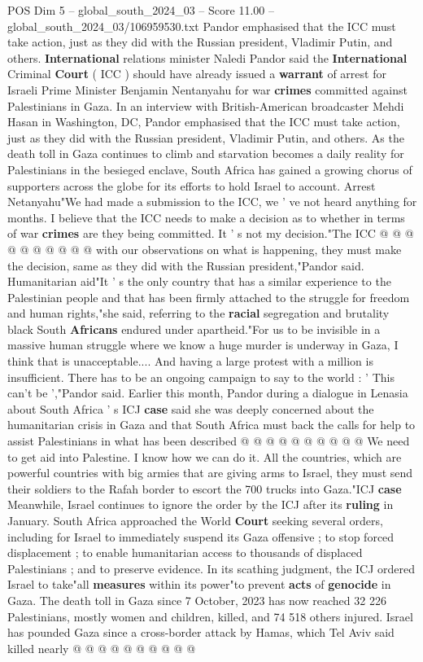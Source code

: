 \begin{textsample}{POS Dim 5 – global\_south\_2024\_03 – Score 11.00 – global\_south\_2024\_03/106959530.txt}  \label{ex:f5_pos_149}
Pandor emphasised that the ICC must take action, just as they did with the Russian president, Vladimir Putin, and others. \textbf{International} relations minister Naledi Pandor said the \textbf{International} Criminal \textbf{Court} ( ICC ) should have already issued a \textbf{warrant} of arrest for Israeli Prime Minister Benjamin Nentanyahu for war \textbf{crimes} committed against Palestinians in Gaza.
In an interview with British-American broadcaster Mehdi Hasan in Washington, DC, Pandor emphasised that the ICC must take action, just as they did with the Russian president, Vladimir Putin, and others.
As the death toll in Gaza continues to climb and starvation becomes a daily reality for Palestinians in the besieged enclave, South Africa has gained a growing chorus of supporters across the globe for its efforts to hold Israel to account.
Arrest Netanyahu"We had made a submission to the ICC, we ' ve not heard anything for months.
I believe that the ICC needs to make a decision as to whether in terms of war \textbf{crimes} are they being committed.
It ' s not my decision."The ICC @ @ @ @ @ @ @ @ @ @ with our observations on what is happening, they must make the decision, same as they did with the Russian president,"Pandor said.
Humanitarian aid"It ' s the only country that has a similar experience to the Palestinian people and that has been firmly attached to the struggle for freedom and human rights,"she said, referring to the \textbf{racial} segregation and brutality black South \textbf{Africans} endured under apartheid."For us to be invisible in a massive human struggle where we know a huge murder is underway in Gaza, I think that is unacceptable....
And having a large protest with a million is insufficient.
There has to be an ongoing campaign to say to the world : ' This can't be ',"Pandor said.
Earlier this month, Pandor during a dialogue in Lenasia about South Africa ' s ICJ \textbf{case} said she was deeply concerned about the humanitarian crisis in Gaza and that South Africa must back the calls for help to assist Palestinians in what has been described @ @ @ @ @ @ @ @ @ @ We need to get aid into Palestine.
I know how we can do it.
All the countries, which are powerful countries with big armies that are giving arms to Israel, they must send their soldiers to the Rafah border to escort the 700 trucks into Gaza."ICJ \textbf{case} Meanwhile, Israel continues to ignore the order by the ICJ after its \textbf{ruling} in January.
South Africa approached the World \textbf{Court} seeking several orders, including for Israel to immediately suspend its Gaza offensive ; to stop forced displacement ; to enable humanitarian access to thousands of displaced Palestinians ; and to preserve evidence.
In its scathing judgment, the ICJ ordered Israel to take"all \textbf{measures} within its power"to prevent \textbf{acts} of \textbf{genocide} in Gaza.
The death toll in Gaza since 7 October, 2023 has now reached 32 226 Palestinians, mostly women and children, killed, and 74 518 others injured.
Israel has pounded Gaza since a cross-border attack by Hamas, which Tel Aviv said killed nearly @ @ @ @ @ @ @ @ @ @


\end{textsample}
